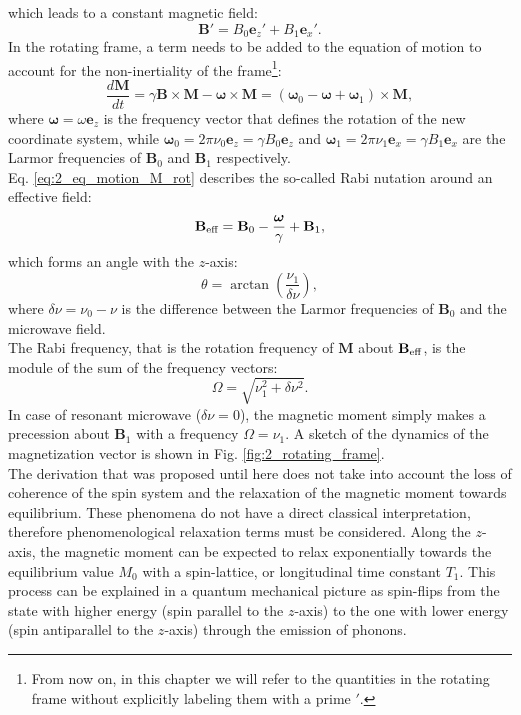 \documentclass[a4paper]{book}
\newcommand{\tsub}{\textsubscript}
\newcommand{\mb}{\mathbf}
\newcommand{\mbe}{\mathbf{e}}
\begin{document}
	which leads to a constant magnetic field:
	\begin{equation}
		\label{eq:2_B_rotating_frame}
		\mb B' = B_0 \mbe_z' + B_1 \mbe_x'.
	\end{equation}
	In the rotating frame, a term needs to be added to the equation of motion to account for the non-inertiality of the frame\footnote{From now on, in this chapter we will refer to the quantities in the rotating frame without explicitly labeling them with a prime $'$.}:
	\begin{equation}
		\frac{d\mb{M}}{dt} = \gamma\mb{B}\times\mb{M} - \boldsymbol \omega \times \mb{M} = (\boldsymbol \omega_0 - \boldsymbol \omega + \boldsymbol \omega_1) \times \mb M,
		\label{eq:2_eq_motion_M_rot}
	\end{equation}
	where $\boldsymbol \omega = \omega \mbe_z$ is the frequency vector that defines the rotation of the new coordinate system, while $\boldsymbol \omega_0 = 2\pi\nu_0 \mbe_z = \gamma B_0 \mbe_z$ and $\boldsymbol \omega_1 = 2\pi\nu_1 \mbe_x = \gamma B_1 \mbe_x$ are the Larmor frequencies of $\mb{B}_0$ and $\mb{B}_1$ respectively.\\
	Eq. \eqref{eq:2_eq_motion_M_rot} describes the so-called Rabi nutation around an effective field:
	\begin{equation}
		\mb{B}\tsub{eff} = \mb{B}_0 - \frac{\boldsymbol \omega}{\gamma} + \mb{B}_1,
		\label{eq:2_Beff}
	\end{equation}
	which forms an angle with the $z$-axis:
	\begin{equation}
		\theta = \arctan\left(\frac{\nu_1}{\delta \nu}\right),
		\label{eq:2_Beff_angle}
	\end{equation}
	where $\delta\nu = \nu_0 - \nu$ is the difference between the Larmor frequencies of $\mb{B}_0$ and the microwave field.\\
	The Rabi frequency, that is the rotation frequency of $\mb{M}$ about $\mb{B}\tsub{eff}$, is the module of the sum of the frequency vectors:
	\begin{equation}
		\Omega = \sqrt{\nu_1^2 + \delta\nu^2}.
		\label{eq_2_rabi_frequency}
	\end{equation}
	In case of resonant microwave ($\delta\nu = 0$), the magnetic moment simply makes a precession about $\mb B_1$ with a frequency $\Omega = \nu_1$. A sketch of the dynamics of the magnetization vector is shown in Fig. \ref{fig:2_rotating_frame}.\\
	The derivation that was proposed until here does not take into account the loss of coherence of the spin system and the relaxation of the magnetic moment towards equilibrium. These phenomena do not have a direct classical interpretation, therefore phenomenological relaxation terms must be considered. Along the $z$-axis, the magnetic moment can be expected to relax exponentially towards the equilibrium value $M_0$ with a spin-lattice, or longitudinal time constant $T_1$. This process can be explained in a quantum mechanical picture as spin-flips from the state with higher energy (spin parallel to the $z$-axis) to the one with lower energy (spin antiparallel to the $z$-axis) through the emission of phonons.\\
\end{document}
